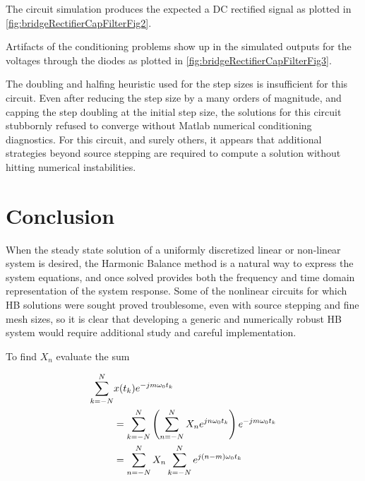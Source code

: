 The circuit simulation produces the expected a DC rectified signal as plotted in \cref{fig:bridgeRectifierCapFilterFig2}.


Artifacts of the conditioning problems show up in the simulated outputs for the voltages through the diodes as plotted in \cref{fig:bridgeRectifierCapFilterFig3}.


The doubling and halfing heuristic used for the step sizes is insufficient for this circuit.
Even after
reducing the step size by a many orders of magnitude, and capping the step doubling at the initial step size, the solutions for this circuit stubbornly refused to converge without Matlab numerical conditioning diagnostics.
For this circuit, and surely others, it appears that additional strategies beyond source stepping are required to compute a solution without hitting numerical instabilities.

\section{Conclusion}

When the steady state solution of a uniformly discretized linear or non-linear system is desired, the Harmonic Balance method is a natural way to express the system equations, and once solved provides both the frequency and time domain representation of the system response.  Some of the nonlinear circuits for which HB solutions were sought proved troublesome, even with source stepping and fine mesh sizes, so it is clear that developing a generic and numerically robust HB system would require additional study and careful implementation.

\appendices

\label{appendix:discreteFourierInversion}

To find \( X_n \) evaluate the sum

\begin{equation}\label{eqn:ece1254projectReport:80}
\begin{aligned}
\sum_{k = -N}^N &x(t_k) e^{-j m \omega_0 t_k} \\
&=
\sum_{k = -N}^N
\lr{
\sum_{n = -N}^N X_n e^{ j n \omega_0 t_k}
}
e^{-j m \omega_0 t_k} \\
&=
\sum_{n = -N}^N X_n
\sum_{k = -N}^N
e^{ j (n -m )\omega_0 t_k}
\end{aligned}
\end{equation}

